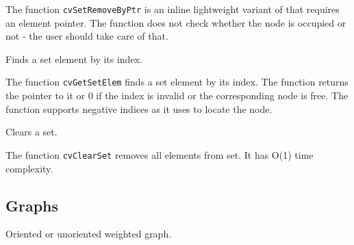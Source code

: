 \begin{description}
\end{description}

The function \texttt{cvSetRemoveByPtr} is an inline lightweight variant of  that requires an element pointer. The function does not check whether the node is occupied or not - the user should take care of that.


\label{GetSetElem}

Finds a set element by its index.


\begin{description}
\end{description}

The function \texttt{cvGetSetElem} finds a set element by its index. The function returns the pointer to it or 0 if the index is invalid or the corresponding node is free. The function supports negative indices as it uses  to locate the node.

\label{ClearSet}

Clears a set.


\begin{description}
\end{description}


The function \texttt{cvClearSet} removes all elements from set. It has O(1) time complexity.

\fi

\ifC
\subsection{Graphs}


\label{CvGraph}

Oriented or unoriented weighted graph.


